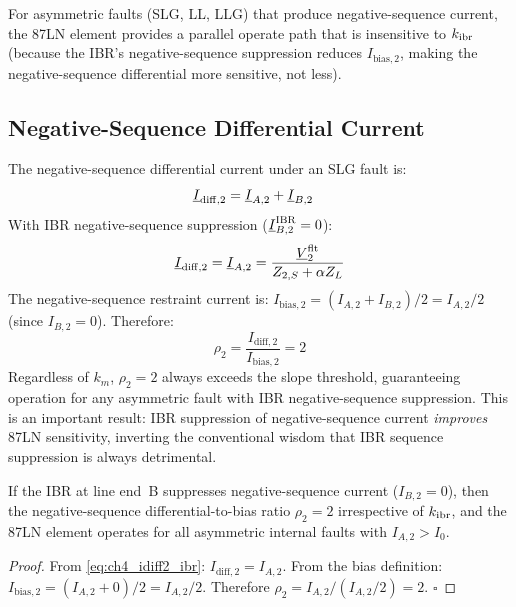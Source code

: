 For asymmetric faults (SLG, LL, LLG) that produce negative-sequence
current, the 87LN element provides a parallel operate path that is
insensitive to $k_{\mathrm{ibr}}$ (because the IBR's negative-sequence suppression
reduces $I_\mathrm{bias,2}$, making the negative-sequence differential
more sensitive, not less).

\subsection{Negative-Sequence Differential Current}

The negative-sequence differential current under an SLG fault is:
\begin{align}
  \underline{I}_\mathrm{diff,2} &= \underline{I}_{A,2} + \underline{I}_{B,2}
  \label{eq:ch4_idiff2}
\end{align}
With IBR negative-sequence suppression ($\underline{I}_{B,2}^\mathrm{IBR} = 0$):
\begin{equation}
  \underline{I}_\mathrm{diff,2} = \underline{I}_{A,2}
  = \frac{\underline{V}_2^\mathrm{flt}}{Z_{2,S} + \alpha Z_L}
  \label{eq:ch4_idiff2_ibr}
\end{equation}
The negative-sequence restraint current is:
$I_\mathrm{bias,2} = (I_{A,2} + I_{B,2})/2 = I_{A,2}/2$
(since $I_{B,2} = 0$). Therefore:
\begin{equation}
  \rho_2 = \frac{I_\mathrm{diff,2}}{I_\mathrm{bias,2}} = 2
  \label{eq:ch4_rho2}
\end{equation}
Regardless of $k_m$, $\rho_2 = 2$ always exceeds the slope threshold,
guaranteeing operation for any asymmetric fault with IBR negative-sequence
suppression. This is an important result: IBR suppression of negative-sequence
current \emph{improves} 87LN sensitivity, inverting the conventional wisdom
that IBR sequence suppression is always detrimental.

\begin{proposition}
\label{prop:ch4_87ln}
If the IBR at line end~B suppresses negative-sequence current
($I_{B,2} = 0$), then the negative-sequence differential-to-bias ratio
$\rho_2 = 2$ irrespective of $k_{\mathrm{ibr}}$, and the 87LN element operates for
all asymmetric internal faults with $I_{A,2} > I_0$.
\end{proposition}

\begin{proof}
From \eqref{eq:ch4_idiff2_ibr}: $I_\mathrm{diff,2} = I_{A,2}$.
From the bias definition: $I_\mathrm{bias,2} = (I_{A,2} + 0)/2 = I_{A,2}/2$.
Therefore $\rho_2 = I_{A,2}/(I_{A,2}/2) = 2$. \qquad $\square$
\end{proof}

